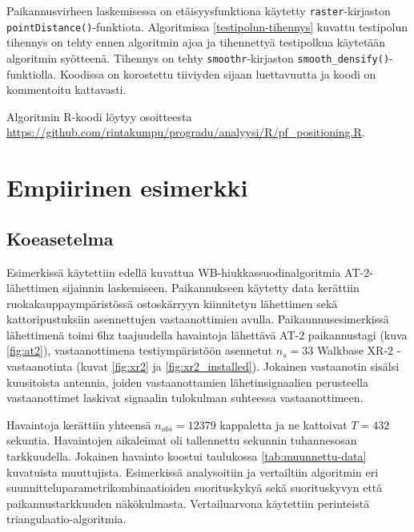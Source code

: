\documentclass[
  12pt,
  a4paper, twoside]{book}
\begin{document}
Paikannusvirheen laskemisessa on etäisyysfunktiona käytetty \texttt{raster}-kirjaston \texttt{pointDistance()}-funktiota. Algoritmissa \ref{testipolun-tihennys} kuvattu testipolun tihennys on tehty ennen algoritmin ajoa ja tihennettyä testipolkua käytetään algoritmin syötteenä. Tihennys on tehty \texttt{smoothr}-kirjaston \texttt{smooth\_densify()}-funktiolla. Koodissa on korostettu tiiviyden sijaan luettavuutta ja koodi on kommentoitu kattavasti.

Algoritmin R-koodi löytyy osoitteesta \url{https://github.com/rintakumpu/progradu/analyysi/R/pf_positioning.R}.

\section{Empiirinen esimerkki} \label{empiirinen-esimerkki}

\subsection{Koeasetelma} \label{koeasetelma}

Esimerkissä käytettiin edellä kuvattua WB-hiukkassuodinalgoritmia AT-2-lähettimen sijainnin laskemiseen. Paikannukseen käytetty data kerättiin ruokakauppaympäristössä ostoskärryyn kiinnitetyn lähettimen sekä kattoripustuksiin asennettujen vastaanottimien avulla. Paikaunnusesimerkissä lähettimenä toimi 6hz taajuudella havaintoja lähettävä AT-2 paikannustagi (kuva \ref{fig:at2}), vastaanottimena testiympäristöön asennetut \(n_s=33\) Walkbase XR-2 -vastaanotinta (kuvat \ref{fig:xr2} ja \ref{fig:xr2_installed}). Jokainen vastaanotin sisälsi kuusitoista antennia, joiden vastaanottamien lähetinsignaalien perusteella vastaanottimet laskivat signaalin tulokulman suhteessa vastaanottimeen.

Havaintoja kerättiin yhteensä \(n_{obs}=12379\) kappaletta ja ne kattoivat \(T=432\) sekuntia. Havaintojen aikaleimat oli tallennettu sekunnin tuhannesosan tarkkuudella. Jokainen havainto koostui taulukossa \ref{tab:muunnettu-data} kuvatuista muuttujista. Esimerkissä analysoitiin ja vertailtiin algoritmin eri suunnitteluparametrikombinaatioiden suorituskykyä sekä suorituskyvyn että paikannustarkkuuden näkökulmasta. Vertailuarvona käytettiin perinteistä triangulaatio-algoritmia.

\newpage
\end{document}
